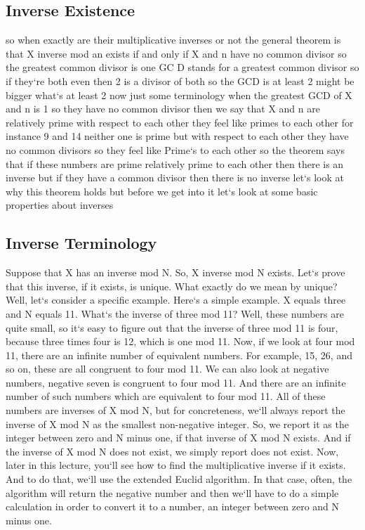 \subsection{Inverse  Existence}
so when exactly are their multiplicative inverses or not the general theorem is that X inverse mod an exists if and only if X and n have no common divisor so the greatest common divisor is one GC D stands for a greatest common divisor so if they`re both even then 2 is a divisor of both so the GCD is at least 2 might be bigger what`s at least 2 now just some terminology when the greatest GCD of X and n is 1 so they have no common divisor then we say that X and n are relatively prime with respect to each other they feel like primes to each other for instance 9 and 14 neither one is prime but with respect to each other they have no common divisors so they feel like Prime`s to each other so the theorem says that if these numbers are prime relatively prime to each other then there is an inverse but if they have a common divisor then there is no inverse let`s look at why this theorem holds but before we get into it let`s look at some basic properties about inverses

\subsection{Inverse  Terminology}
Suppose that X has an inverse mod N\@.
So, X inverse mod N exists.
Let`s prove that this inverse, if it exists, is unique.
What exactly do we mean by unique? Well, let`s consider a specific example.
Here`s a simple example.
X equals three and N equals 11.
What`s the inverse of three mod 11? Well, these numbers are quite small, so it`s easy to figure out that the inverse of three mod 11 is four, because three times four is 12, which is one mod 11.
Now, if we look at four mod 11, there are an infinite number of equivalent numbers.
For example, 15, 26, and so on, these are all congruent to four mod 11.
We can also look at negative numbers, negative seven is congruent to four mod 11.
And there are an infinite number of such numbers which are equivalent to four mod 11.
All of these numbers are inverses of X mod N, but for concreteness, we`ll always report the inverse of X mod N as the smallest non-negative integer.
So, we report it as the integer between zero and N minus one, if that inverse of X mod N exists.
And if the inverse of X mod N does not exist, we simply report does not exist.
Now, later in this lecture, you`ll see how to find the multiplicative inverse if it exists.
And to do that, we`ll use the extended Euclid algorithm.
In that case, often, the algorithm will return the negative number and then we`ll have to do a simple calculation in order to convert it to a number, an integer between zero and N minus one.

